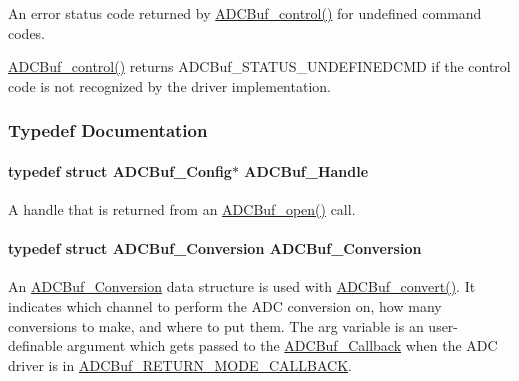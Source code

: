 An error status code returned by \hyperlink{_a_d_c_buf_8h_a9b9765fb0ac57dee9df234a79dcd5aea}{A\+D\+C\+Buf\+\_\+control()} for undefined command codes. 

\hyperlink{_a_d_c_buf_8h_a9b9765fb0ac57dee9df234a79dcd5aea}{A\+D\+C\+Buf\+\_\+control()} returns A\+D\+C\+Buf\+\_\+\+S\+T\+A\+T\+U\+S\+\_\+\+U\+N\+D\+E\+F\+I\+N\+E\+D\+C\+M\+D if the control code is not recognized by the driver implementation. 

\subsubsection{Typedef Documentation}
\paragraph[{A\+D\+C\+Buf\+\_\+\+Handle}]{\setlength{\rightskip}{0pt plus 5cm}typedef struct {\bf A\+D\+C\+Buf\+\_\+\+Config}$\ast$ {\bf A\+D\+C\+Buf\+\_\+\+Handle}}\label{_a_d_c_buf_8h_a9b9646efcf7a7fd38a2935abd940cf96}


A handle that is returned from an \hyperlink{_a_d_c_buf_8h_a0b63bca2e8f8e5b58f0c657ac662c97b}{A\+D\+C\+Buf\+\_\+open()} call. 

\paragraph[{A\+D\+C\+Buf\+\_\+\+Conversion}]{\setlength{\rightskip}{0pt plus 5cm}typedef struct {\bf A\+D\+C\+Buf\+\_\+\+Conversion}  {\bf A\+D\+C\+Buf\+\_\+\+Conversion}}\label{_a_d_c_buf_8h_af4e6495373ac4fb3c86d3c40be779ecc}


An \hyperlink{struct_a_d_c_buf___conversion}{A\+D\+C\+Buf\+\_\+\+Conversion} data structure is used with \hyperlink{_a_d_c_buf_8h_a762253a94875258c5a71b591f03f9d97}{A\+D\+C\+Buf\+\_\+convert()}. It indicates which channel to perform the A\+D\+C conversion on, how many conversions to make, and where to put them. The arg variable is an user-\/definable argument which gets passed to the \hyperlink{_a_d_c_buf_8h_a477c377c65f8de04aa67ff7eefa0a4cf}{A\+D\+C\+Buf\+\_\+\+Callback} when the A\+D\+C driver is in \hyperlink{_a_d_c_buf_8h_a3d643e8024503c5ef2679c83419ba6eea633b4b063b88d7c62e9e2513075a36a7}{A\+D\+C\+Buf\+\_\+\+R\+E\+T\+U\+R\+N\+\_\+\+M\+O\+D\+E\+\_\+\+C\+A\+L\+L\+B\+A\+C\+K}. 

